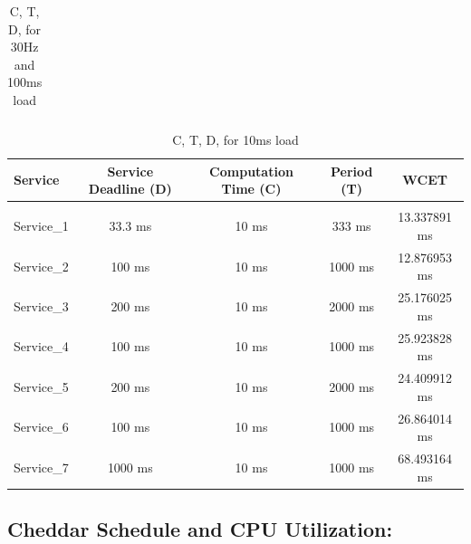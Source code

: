 \documentclass[a4paper,11pt]{article}%
\newenvironment{qanda}{\setlength{\parindent}{0pt}}{\bigskip}
\begin{document}
\begin{qanda}
\begin{enumerate}
\begin{table}[H]
\begin{tabular}{l c c c c}
					\hline\hline
				\end{tabular}
				\caption{C, T, D, for 30Hz and 100ms load}
			\end{table}

			\begin{table}[H]
				\centering
				\begin{tabular}{l c c c c}
					\hline
					\textbf{Service} & \textbf{Service	Deadline (D)} & \textbf{Computation Time (C)} & \textbf{Period (T)} & \textbf{WCET} \\\hline
					                 &                              &                                                                     \\
					Service\_1       & 33.3 ms                      & 10 ms                         & 333 ms              & 13.337891 ms  \\
					Service\_2       & 100 ms                       & 10 ms                         & 1000 ms             & 12.876953 ms  \\
					Service\_3       & 200 ms                       & 10 ms                         & 2000 ms             & 25.176025 ms  \\
					Service\_4       & 100 ms                       & 10 ms                         & 1000 ms             & 25.923828 ms  \\
					Service\_5       & 200 ms                       & 10 ms                         & 2000 ms             & 24.409912 ms  \\
					Service\_6       & 100 ms                       & 10 ms                         & 1000 ms             & 26.864014 ms  \\
					Service\_7       & 1000 ms                      & 10 ms                         & 1000 ms             & 68.493164 ms  \\

					\hline\hline
				\end{tabular}
				\caption{C, T, D, for 10ms load}
			\end{table}



			\subsection{Cheddar Schedule and CPU Utilization:}


\end{enumerate}
\end{qanda}
\end{document}
